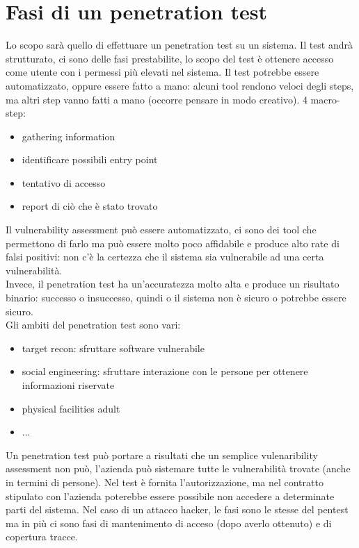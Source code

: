 \documentclass{article}
\begin{document}
\section{Fasi di un penetration test}
Lo scopo sarà quello di effettuare un penetration test su un sistema. Il test andrà strutturato, ci sono delle fasi prestabilite, lo scopo del test è ottenere accesso come utente con i permessi più elevati nel sistema. Il test potrebbe essere automatizzato, oppure essere fatto a mano: alcuni tool rendono veloci degli steps, ma altri step vanno fatti a mano (occorre pensare in modo creativo). 4 macro-step:
\begin{itemize}
\item gathering information
\item identificare possibili entry point
\item tentativo di accesso
\item report di ciò che è stato trovato
\end{itemize}
Il vulnerability assessment può essere automatizzato, ci sono dei tool che permettono di farlo ma può essere molto poco affidabile e produce alto rate di falsi positivi: non c'è la certezza che il sistema sia vulnerabile ad una certa vulnerabilità.\\ Invece, il penetration test ha un'accuratezza molto alta e produce un risultato binario: successo o insuccesso, quindi o il sistema non è sicuro o potrebbe essere sicuro.\\ Gli ambiti del penetration test sono vari:
\begin{itemize}
\item target recon: sfruttare software vulnerabile
\item social engineering: sfruttare interazione con le persone per ottenere informazioni riservate
\item physical facilities adult
\item ...
\end{itemize}
Un penetration test può portare a risultati che un semplice vulenaribility assessment non può, l'azienda può sistemare tutte le vulnerabilità trovate (anche in termini di persone). Nel test è fornita l'autorizzazione, ma nel contratto stipulato con l'azienda poterebbe essere possibile non accedere a determinate parti del sistema. Nel caso di un attacco hacker, le fasi sono le stesse del pentest ma in più ci sono fasi di mantenimento di acceso (dopo averlo ottenuto) e di copertura tracce.
\end{document}

